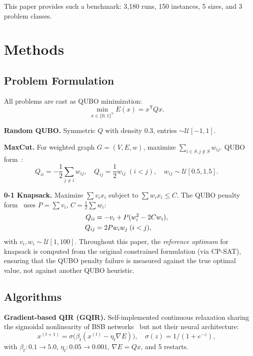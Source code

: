 \documentclass[10pt,twocolumn]{article}
\begin{document}
This paper provides such a benchmark: 3,180 runs, 150 instances, 5 sizes, and 3 problem classes.

\section{Methods}
\label{sec:methods}

\subsection{Problem Formulation}
All problems are cast as QUBO minimization:
\begin{equation}\label{eq:qubo}
\min_{x\in\{0,1\}^n} E(x)=x^{\mathsf{T}}Qx.
\end{equation}

\textbf{Random QUBO.} Symmetric $Q$ with density $0.3$, entries $\sim\mathcal{U}[-1,1]$.

\textbf{MaxCut.} For weighted graph $G=(V,E,w)$, maximize $\sum_{i\in S,j\notin S}w_{ij}$. QUBO form~\cite{lucas2014}:
\begin{equation}\label{eq:maxcut}
Q_{ii}=-\frac12\sum_{j\neq i}w_{ij},\quad
Q_{ij}=\frac12 w_{ij}\;(i<j),\quad w_{ij}\sim\mathcal{U}[0.5,1.5].
\end{equation}

\textbf{0-1 Knapsack.} Maximize $\sum v_i x_i$ subject to $\sum w_i x_i\leq C$. The QUBO penalty form~\cite{gange2022} uses $P=\sum v_i$, $C=\frac12\sum w_i$:
\begin{align}\label{eq:knap}
Q_{ii}&=-v_i+P(w_i^2-2Cw_i),\notag\\
Q_{ij}&=2P w_i w_j\;(i<j),\notag
\end{align}
with $v_i,w_i\sim\mathcal{U}[1,100]$. Throughout this paper, the \emph{reference optimum} for knapsack is computed from the original constrained formulation (via CP-SAT), ensuring that the QUBO penalty failure is measured against the true optimal value, not against another QUBO heuristic.

\subsection{Algorithms}

\textbf{Gradient-based QIR (GQIR).} Self-implemented continuous relaxation sharing the sigmoidal nonlinearity of BSB networks~\cite{peterson1991} but not their neural architecture:
\begin{equation}\label{eq:gqir}
x^{(t+1)}=\sigma\bigl(\beta_t(x^{(t)}-\eta_t\nabla E)\bigr),\quad
\sigma(z)=1/(1+e^{-z}),
\end{equation}
with $\beta_t:0.1\to5.0$, $\eta_t:0.05\to0.001$, $\nabla E=Qx$, and 5 restarts.
\end{document}
